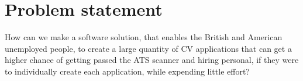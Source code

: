 \section{Problem statement}\label{sec:problem}
How can we make a software solution, 
that enables the British and American unemployed people, to create a large quantity of CV applications that can get 
a higher chance of getting passed the ATS scanner and hiring personal, 
if they were to individually create each application, while expending little effort?